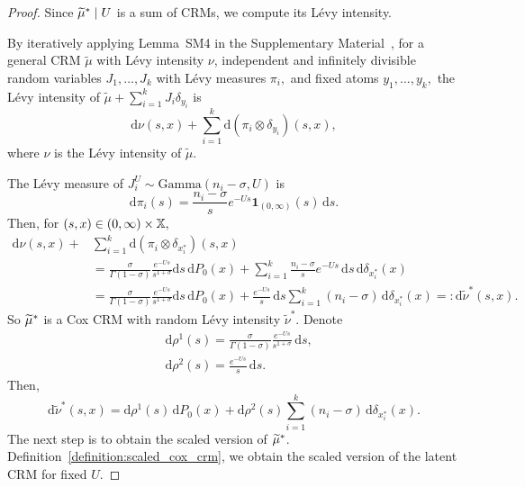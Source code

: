 \begin{proof}

Since $\widetilde{\mu}^* \mid U$ is a sum of CRMs, we compute its L\'evy intensity.

By iteratively applying Lemma~SM4 in the Supplementary Material~\cite{catalano2026merging}, for a general CRM $\tilde{\mu}$ with L\'evy intensity $\nu$, independent and infinitely divisible random variables $J_1,\dots, J_k$ with L\'evy measures $\pi_i,$ and fixed atoms $y_1,\dots, y_k,$ the L\'evy intensity of $\tilde{\mu} + \sum_{i = 1}^k J_i \delta_{y_i}$ is
\[
\mathrm{d}\nu(s,x) + \sum_{i = 1}^k \mathrm{d}\left( \pi_i \otimes \delta_{y_i} \right)(s,x),
\]
where $\nu$ is the L\'evy intensity of $\tilde{\mu}$.

The L\'evy measure of $J_i^U \sim \mathrm{Gamma}(n_i - \sigma, U)$ is
\[
\mathrm{d}\pi_i(s) = \frac{n_i - \sigma}{s} e^{-Us}\mathbf{1}_{(0,\infty)}(s)\,\mathrm{d}s.
\]
Then, for $(s,x) \in (0,\infty)\times\mathbb{X},$
\begin{align*}
    \mathrm{d}\nu(s,x) + &\sum_{i = 1}^k \mathrm{d}\left( \pi_i \otimes \delta_{x_i^*} \right)(s,x)  \\
    & = \frac{\sigma}{\Gamma(1-\sigma)}\frac{e^{-Us}}{s^{1+\sigma}}\mathrm{d}s\,\mathrm{d}P_0(x) + \sum_{i=1}^k \frac{n_i - \sigma}{s}e^{-Us}\,\mathrm{d}s\,\mathrm{d}\delta_{x_i^*}(x) \\
    & = \frac{\sigma}{\Gamma(1-\sigma)}\frac{e^{-Us}}{s^{1+\sigma}}\mathrm{d}s\,\mathrm{d}P_0(x) + \frac{e^{-Us}}{s}\,\mathrm{d}s\sum_{i = 1}^k (n_i - \sigma)\,\mathrm{d}\delta_{x_i^*}(x) =: \mathrm{d}\tilde{\nu}^*(s,x).
\end{align*}
So $\widetilde{\mu}^*$ is a Cox CRM with random L\'evy intensity $\tilde{\nu}^*$. Denote
\begin{align*}
    & \mathrm{d}\rho^1(s) = \frac{\sigma}{\Gamma(1-\sigma)}\frac{e^{-Us}}{s^{1+\sigma}}\,\mathrm{d}s,\\
    & \mathrm{d}\rho^2(s) = \frac{e^{-Us}}{s}\,\mathrm{d}s.
\end{align*}
Then,
\[
\mathrm{d}\tilde{\nu}^*(s,x) = \mathrm{d}\rho^1(s)\,\mathrm{d}P_0(x) + \mathrm{d}\rho^2(s)\sum_{i = 1}^k (n_i - \sigma)\,\mathrm{d}\delta_{x_i^*}(x).
\]
The next step is to obtain the scaled version of $\widetilde{\mu}^*$.  Definition~\ref{definition:scaled_cox_crm}, we obtain the scaled version of the latent CRM for fixed $U$.


\end{proof}
